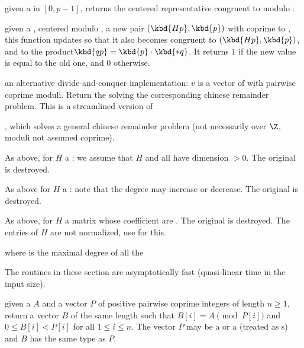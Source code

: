  given a   in
$[0, p-1]$, returns the centered representative  congruent to 
modulo .

given a  , centered modulo , a new pair $(\kbd{Hp},
\kbd{p})$ with  coprime to , this function updates  so
that it also becomes congruent to $(\kbd{Hp}, \kbd{p})$, and  to the
product$\kbd{qp} = \kbd{p} \cdot \kbd{*q}$. It returns $1$ if the new value
is equal to the old one, and $0$ otherwise.

 an alternative divide-and-conquer
implementation: $v$ is a vector of  with pairwise coprime moduli.
Return the  solving the corresponding chinese remainder problem.
This is a streamlined version of

, which solves a general chinese remainder problem
(not necessarily over $\Z$, moduli not assumed coprime).

As above, for $H$ a : we assume that $H$ and all  have
dimension $> 0$. The original  is destroyed.



As above for $H$ a : note that the degree may increase or decrease.
The original  is destroyed.



As above, for $H$ a matrix whose coefficient are .
The original  is destroyed.
The entries of $H$ are not normalized, use 
for this.

 where 
is the maximal degree of all the 



The routines in these section are asymptotically fast (quasi-linear time in
the input size).

 given a  $A$ and a vector $P$ of
positive pairwise coprime integers of length $n\ge 1$, return a vector $B$ of
the same length such that $B[i] = A\pmod{P[i]}$ and $0\leq B[i] < P[i]$ for
all $1\leq i\leq n$. The vector $P$ may be a  or a 
(treated as s) and $B$ has the same type as $P$.

